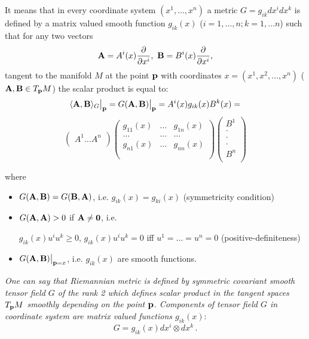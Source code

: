 \documentclass[12pt]{article}
\theoremstyle{theorem}
\numberwithin{equation}{section}
\begin{document}
  It means that in every coordinate system $(x^1,\dots,x^n)$
  a metric $G=g_{ik}dx^idx^k$ is defined by a matrix valued smooth function $g_{ik}(x)$ ($i=1,\dots,n;k=1,\dots n$)
  such that for any two vectors
       $$
  {\bf A}=A^i(x){\partial\over \partial x^i},\,\, {\bf B}=B^i(x){\partial\over \partial x^i},
      $$
tangent to the manifold $M$ at the point ${\bf p}$ with coordinates $x=(x^1,x^2,\dots,x^n)$ (${\bf A},{\bf B}\in T_{{\bf p}}M$)
the scalar product is equal to:
              $$
              \langle{\bf A},{\bf B}\rangle_G\big\vert_{\bf p}= G({\bf A},{\bf B})\big\vert_{\bf p}=
A^i(x)g_{ik}(x)B^k(x)=
            $$
            \begin{equation}\label{scalarproduct}
  \begin{pmatrix}
   A^1 \dots A^n\\
   \end{pmatrix}
  \begin{pmatrix}
     g_{11}(x)&\dots &g_{1n}(x)\\
      \dots &\dots & \dots \\
         g_{n1}(x)&\dots &g_{nn}(x)\\  \\
   \end{pmatrix}
\begin{pmatrix}
   B^1\\
     \cdot \\
   \cdot\\
   \cdot\\
   B^n\\
   \end{pmatrix}
\end{equation}

where
\begin{itemize}

  \item  $G({\bf A},{\bf B})=G({\bf B},{\bf A})$, i.e.  $g_{ik}(x)=g_{ki}(x)$ (symmetricity condition)

    \item
       $G({\bf A},{\bf A})>0$ if $\bf A\not=0$, i.e.

    $g_{ik}(x)u^iu^k\geq 0$, $g_{ik}(x)u^iu^k=0$ iff $u^1=\dots=u^n=0$  (positive-definiteness)

   \item  $G({\bf A},{\bf B})\big\vert_{{\bf p}=x}$, i.e. $g_{ik}(x)$ are smooth functions.


\end{itemize}


{\it One can say that Riemannian metric is defined by  symmetric covariant smooth tensor field $G$ of the rank 2
which defines scalar product in the tangent spaces $T_{{\bf p}}M$ smoothly depending on the point ${\bf p}$.
 Components of tensor field  $G$ in coordinate system are matrix valued functions $g_{ik}(x)$}:
\begin{equation}\label{symb}
    G=g_{ik}(x)dx^i\otimes dx^k\,.
\end{equation}
\end{document}
